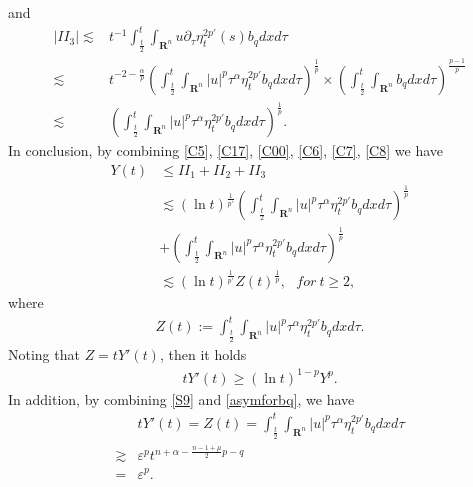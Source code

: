 \documentclass[review]{elsarticle}
\newcommand{\e}{\varepsilon}
\newcommand{\R}{\mathbf{R}}
\begin{document}
and
\begin{equation}\label{C8}
\begin{aligned}
|II_3|\lesssim&t^{-1}\int_{\frac{t}{2}}^t\int_{\R^n}u\partial_\tau\eta_t^{2p'}(s)b_qdxd\tau\\
\lesssim&t^{-2-\frac{\alpha}{p}}\left(\int_{\frac t2}^t\int_{\R^n}|u|^p\tau^{\alpha}\eta_t^{2p'}b_q
dxd\tau\right)^{\frac1p}\times\left(\int_{\frac t2}^{t}\int_{\R^n}b_qdxd\tau\right)^{\frac{p-1}p}\\
\lesssim&\left(\int_{\frac t2}^t\int_{\R^n}|u|^p\tau^{\alpha}\eta_t^{2p'}b_q
dxd\tau\right)^{\frac1p}.
\end{aligned}
\end{equation}
In conclusion, by combining \eqref{C5}, \eqref{C17}, \eqref{C00}, \eqref{C6}, \eqref{C7}, \eqref{C8} we have
\begin{equation}\label{C27}
\begin{aligned}
Y(t)&\leq II_1+II_2+II_3\\
&\lesssim(\ln t)^{\frac{1}{p'}}\left(\int_{\frac t2}^t\int_{\R^n}|u|^p\tau^{\alpha}\eta_t^{2p'}b_q
dxd\tau\right)^{\frac1p}\\
&+\left(\int_{\frac t2}^t\int_{\R^n}|u|^p\tau^{\alpha}\eta_t^{2p'}b_q
dxd\tau\right)^{\frac1p}\\
&\lesssim(\ln t)^{\frac{1}{p'}}Z(t)^{\frac{1}{p}},~~~for~t\ge 2,
\end{aligned}
\end{equation}
where
\begin{equation}\label{C28}
\begin{aligned}
Z(t):=\int_{\frac t2}^t\int_{\R^n}|u|^p\tau^{\alpha}\eta_t^{2p'}b_q
dxd\tau.
\end{aligned}
\end{equation}
Noting that $Z=tY'(t)$, then it holds
\begin{equation}\label{C29}
\begin{aligned}
tY'(t)\geq (\ln t)^{1-p}Y^p.
\end{aligned}
\end{equation}
In addition, by combining  \eqref{S9} and \eqref{asymforbq}, we have
\begin{equation}\label{C30}
\begin{aligned}
&tY'(t)=Z(t)=\int_{\frac t2}^t\int_{\R^n}|u|^p\tau^{\alpha}\eta_t^{2p'}b_qdxd\tau\\
\gtrsim& \e^pt^{n+\alpha-\frac{n-1+\mu}{2}p-q}\\
=&\e^p.
\end{aligned}
\end{equation}
\end{document}
